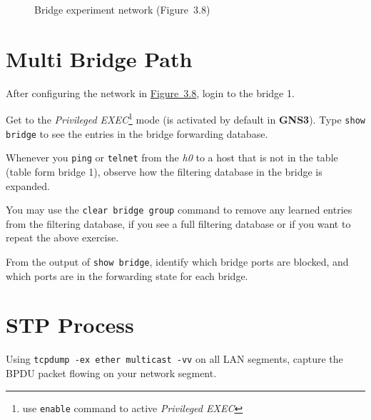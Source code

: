 \documentclass{../UTNetLab}
\begin{document}
\begin{figure}[H]
        \caption{Bridge experiment network (Figure~3.8)}\label{fig:3.8}
    \end{figure}

\section{Multi Bridge Path}
    After configuring the network in \hyperref[fig:3.8]{Figure~3.8}, login to the bridge 1.

    Get to the \textit{Privileged EXEC}\footnote{use \lstinline[language=cisco]{enable} command to active \textit{Privileged EXEC}} mode (is activated by default in \textbf{GNS3}).
    Type \lstinline[language={cisco}]{show bridge} to see the entries in the bridge forwarding database.

    Whenever you \lstinline{ping} or \lstinline{telnet} from the \textit{h0} to a host that is not in the table (table form bridge 1), observe how the filtering database in the bridge is expanded.

    You may use the \lstinline[language={cisco}, emph={group}]{clear bridge group} command to remove any learned entries from the filtering database, if you see a full filtering database or if you want to repeat the above exercise.

    \begin{report}
        \item From the output of \lstinline[language={cisco}]{show bridge}, identify which bridge ports are blocked, and which ports are in the forwarding state for each bridge.
    \end{report}

\section{STP Process}
    Using \lstinline{tcpdump -ex ether multicast -vv} on all LAN segments, capture the BPDU packet flowing on your network segment.
\end{document}
